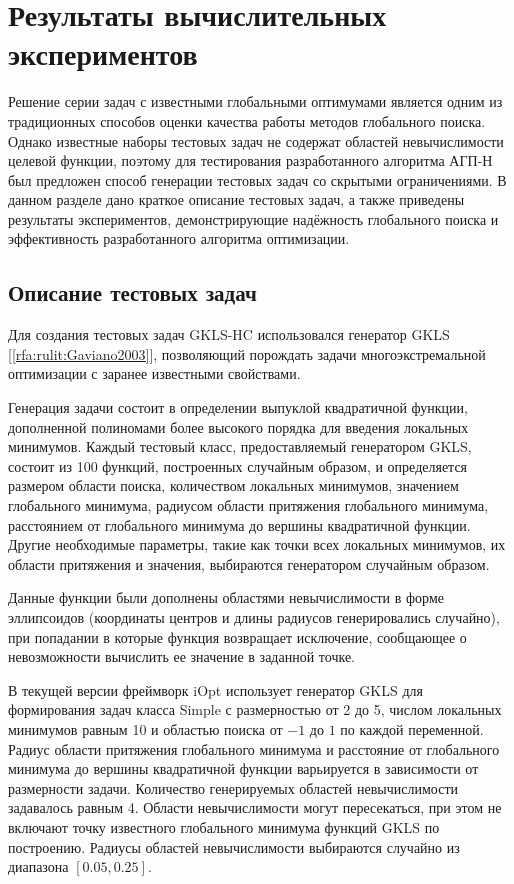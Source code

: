 \documentclass[a4paper,12pt,russian]{article}
\begin{document}
\section{Результаты вычислительных экспериментов}

Решение серии задач с известными глобальными оптимумами является одним из традиционных способов оценки качества работы методов глобального поиска. 
Однако известные наборы тестовых задач не содержат областей невычислимости целевой функции, поэтому для тестирования разработанного алгоритма АГП-Н был предложен способ генерации тестовых задач со скрытыми ограничениями. В данном разделе дано краткое описание тестовых задач, а также приведены результаты экспериментов, демонстрирующие надёжность глобального поиска и эффективность разработанного алгоритма оптимизации.

\subsection{Описание тестовых задач} \label{GKLS_HC}
 
Для создания тестовых задач GKLS-HC использовался генератор GKLS [\ref{rfa:rulit:Gaviano2003}], позволяющий порождать задачи многоэкстремальной оптимизации с заранее известными свойствами. 

Генерация задачи состоит в определении выпуклой квадратичной функции, дополненной полиномами более высокого порядка для введения локальных минимумов. Каждый тестовый класс, предоставляемый генератором GKLS, состоит из 100 функций, построенных случайным образом, и определяется размером области поиска, количеством локальных минимумов, значением глобального минимума, радиусом области притяжения глобального минимума, расстоянием от глобального минимума до вершины квадратичной функции. Другие необходимые параметры, такие как точки всех локальных минимумов, их области притяжения и значения, выбираются генератором случайным образом.

Данные функции были дополнены областями невычислимости в форме эллипсоидов (координаты центров и длины радиусов генерировались случайно), при попадании в которые функция возвращает исключение, сообщающее о невозможности вычислить ее значение в заданной точке.

В текущей версии фреймворк iOpt использует генератор GKLS для формирования задач класса Simple с размерностью от 2 до 5, числом локальных минимумов равным 10 и областью поиска от $-1$ до $1$ по каждой переменной. Радиус области притяжения глобального минимума и расстояние от глобального минимума до вершины квадратичной функции варьируется в зависимости от размерности задачи. Количество генерируемых областей невычислимости задавалось равным 4. Области невычислимости могут пересекаться, при этом не включают точку известного глобального минимума функций GKLS по построению. Радиусы областей невычислимости выбираются случайно из диапазона $[0.05, 0.25]$.
\end{document}
